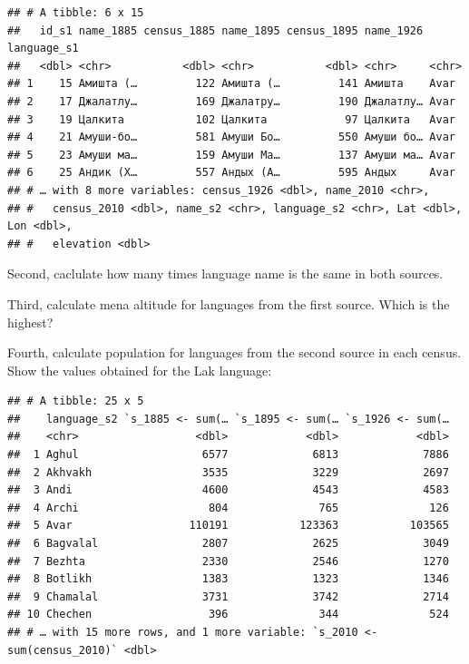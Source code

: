 \documentclass[
]{book}
\makeatletter
\newenvironment{kframe}{%
\medskip{}
\setlength{\fboxsep}{.8em}
 \def\at@end@of@kframe{}%
 \ifinner\ifhmode%
  \def\at@end@of@kframe{\end{minipage}}%
  \begin{minipage}{\columnwidth}%
 \fi\fi%
 \def\FrameCommand##1{\hskip\@totalleftmargin \hskip-\fboxsep
 \colorbox{shadecolor}{##1}\hskip-\fboxsep
     \hskip-\linewidth \hskip-\@totalleftmargin \hskip\columnwidth}%
 \MakeFramed {\advance\hsize-\width
   \@totalleftmargin\z@ \linewidth\hsize
   \@setminipage}}%
 {\par\unskip\endMakeFramed%
 \at@end@of@kframe}
\newenvironment{rmdblock}[1]
  {
  \begin{itemize}
  \renewcommand{\labelitemi}{
    \raisebox{-.7\height}[0pt][0pt]{
      {\setkeys{Gin}{width=3em,keepaspectratio}\texttt{[image: images/\#1]}}
    }
  }
  \setlength{\fboxsep}{1em}
  \begin{kframe}
  \item
  }
  {
  \end{kframe}
  \end{itemize}
  }
\newenvironment{rmdtask}
  {\begin{rmdblock}{task}}
  {\end{rmdblock}}
\makeatother
\begin{document}
\begin{verbatim}
## # A tibble: 6 x 15
##   id_s1 name_1885 census_1885 name_1895 census_1895 name_1926 language_s1
##   <dbl> <chr>           <dbl> <chr>           <dbl> <chr>     <chr>      
## 1    15 Амишта (…         122 Амишта (…         141 Амишта    Avar       
## 2    17 Джалатлу…         169 Джалатру…         190 Джалатлу… Avar       
## 3    19 Цалкита           102 Цалкита            97 Цалкита   Avar       
## 4    21 Амуши-бо…         581 Амуши Бо…         550 Амуши бо… Avar       
## 5    23 Амуши ма…         159 Амуши Ма…         137 Амуши ма… Avar       
## 6    25 Андик (Х…         557 Андых (А…         595 Андых     Avar       
## # … with 8 more variables: census_1926 <dbl>, name_2010 <chr>,
## #   census_2010 <dbl>, name_s2 <chr>, language_s2 <chr>, Lat <dbl>, Lon <dbl>,
## #   elevation <dbl>
\end{verbatim}

\begin{rmdtask}
Second, caclulate how many times language name is the same in both
sources.
\end{rmdtask}

\begin{rmdtask}
Third, calculate mena altitude for languages from the first source.
Which is the highest?
\end{rmdtask}

\begin{rmdtask}
Fourth, calculate population for languages from the second source in
each census. Show the values obtained for the Lak language:
\end{rmdtask}

\begin{verbatim}
## # A tibble: 25 x 5
##    language_s2 `s_1885 <- sum(… `s_1895 <- sum(… `s_1926 <- sum(…
##    <chr>                  <dbl>            <dbl>            <dbl>
##  1 Aghul                   6577             6813             7886
##  2 Akhvakh                 3535             3229             2697
##  3 Andi                    4600             4543             4583
##  4 Archi                    804              765              126
##  5 Avar                  110191           123363           103565
##  6 Bagvalal                2807             2625             3049
##  7 Bezhta                  2330             2546             1270
##  8 Botlikh                 1383             1323             1346
##  9 Chamalal                3731             3742             2714
## 10 Chechen                  396              344              524
## # … with 15 more rows, and 1 more variable: `s_2010 <- sum(census_2010)` <dbl>
\end{verbatim}
\end{document}
